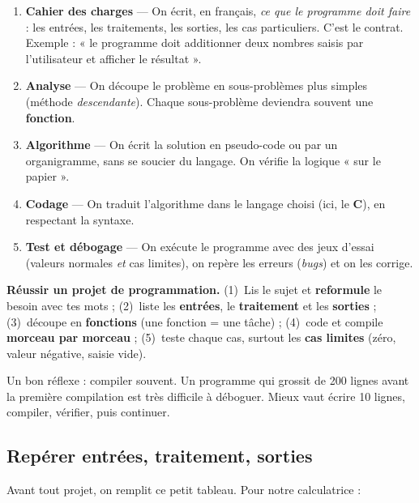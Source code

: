\begin{enumerate}[label=\arabic*)]
  \item \textbf{Cahier des charges} — On écrit, en français, \emph{ce que le
        programme doit faire} : les entrées, les traitements, les sorties, les cas
        particuliers. C'est le contrat. Exemple : « le programme doit additionner
        deux nombres saisis par l'utilisateur et afficher le résultat ».
  \item \textbf{Analyse} — On découpe le problème en sous-problèmes plus simples
        (méthode \emph{descendante}). Chaque sous-problème deviendra souvent une
        \textbf{fonction}.
  \item \textbf{Algorithme} — On écrit la solution en pseudo-code ou par un
        organigramme, sans se soucier du langage. On vérifie la logique « sur le
        papier ».
  \item \textbf{Codage} — On traduit l'algorithme dans le langage choisi (ici, le
        \textbf{C}), en respectant la syntaxe.
  \item \textbf{Test et débogage} — On exécute le programme avec des jeux d'essai
        (valeurs normales \emph{et} cas limites), on repère les erreurs
        (\emph{bugs}) et on les corrige.
\end{enumerate}

\begin{methode}
\textbf{Réussir un projet de programmation.}
(1)~Lis le sujet et \textbf{reformule} le besoin avec tes mots ;
(2)~liste les \textbf{entrées}, le \textbf{traitement} et les \textbf{sorties} ;
(3)~découpe en \textbf{fonctions} (une fonction = une tâche) ;
(4)~code et compile \textbf{morceau par morceau} ;
(5)~teste chaque cas, surtout les \textbf{cas limites} (zéro, valeur négative,
saisie vide).
\end{methode}

\begin{remarque}
Un bon réflexe : compiler souvent. Un programme qui grossit de 200 lignes avant la
première compilation est très difficile à déboguer. Mieux vaut écrire 10 lignes,
compiler, vérifier, puis continuer.
\end{remarque}

\subsection{Repérer entrées, traitement, sorties}

Avant tout projet, on remplit ce petit tableau. Pour notre calculatrice :

